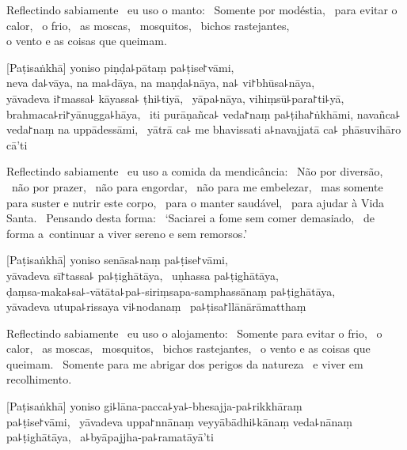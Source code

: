 \begin{english}
  Reflectindo sabiamente \pause\ eu uso o manto: \pause\ Somente por modéstia, \pause\
  para evitar o calor, \pause\ o frio, \pause\ as moscas, \pause\ mosquitos,
  \pause\ bichos rastejantes, \pause\\ o vento e as coisas que queimam.
\end{english}

[Paṭisaṅkhā] yoniso piṇḍa꜕pātaṃ pa꜕ṭise꜓vāmi, \pause\\
neva da꜕vāya, na ma꜕dāya, na maṇḍa꜕nāya, na꜕ vi꜓bhūsa꜕nāya, \pause\\
yāvadeva i꜓massa꜕ kāyassa꜕ ṭhi꜕tiyā, \pause\ yāpa꜕nāya, vihiṃsū꜕para꜓ti꜕yā, \pause\\
brahmaca꜕ri꜓yānugga꜕hāya, \pause\ iti purāṇañca꜕ veda꜓naṃ pa꜕ṭiha꜓ṅkhāmi,
navañca꜕ veda꜓naṃ na uppādessāmi, \pause\ yātrā ca꜕ me bhavissati a꜕navajjatā
ca꜕ phāsuvihāro cā'ti

\begin{english}
  Reflectindo sabiamente \pause\ eu uso a comida da mendicância: \pause\ Não por
  diversão, \pause\ não por prazer, \pause\ não para engordar, \pause\ não para
  me embelezar, \pause\ mas somente para suster e nutrir este corpo, \pause\
  para o manter saudável, \pause\ para ajudar à Vida Santa. \pause\ Pensando
  desta forma: \pause\ `Saciarei a fome sem comer demasiado, \pause\ de
  forma a~continuar a viver sereno e sem remorsos.'
\end{english}

\clearpage

[Paṭisaṅkhā] yoniso senāsa꜕naṃ pa꜕ṭise꜓vāmi, \pause\\
yāvadeva sī꜓tassa꜕ pa꜕ṭighātāya, \pause\ uṇhassa pa꜕ṭighātāya, \pause\\
ḍaṃsa-maka꜕sa꜕-vātāta꜕pa꜕-siriṃsapa-samphassānaṃ pa꜕ṭighātāya, \pause\\
yāvadeva utupa꜕rissaya vi꜕nodanaṃ \pause\ pa꜕ṭisa꜓llānārāmatthaṃ

\begin{english}
  Reflectindo sabiamente \pause\ eu uso o alojamento: \pause\ Somente para evitar o
  frio, \pause\ o calor, \pause\ as moscas, \pause\ mosquitos, \pause\ bichos
  rastejantes, \pause\ o vento e as coisas que queimam. \pause\ Somente para me
  abrigar dos perigos da natureza \pause\ e viver em recolhimento.
\end{english}

[Paṭisaṅkhā] yoniso gi꜕lāna-pacca꜕ya꜕-bhesajja-pa꜕rikkhāraṃ\\
pa꜕ṭise꜓vāmi, \pause\ yāvadeva uppa꜓nnānaṃ veyyābādhi꜕kānaṃ veda꜕nānaṃ
pa꜕ṭighātāya, \pause\ a꜕byāpajjha-pa꜕ramatāyā'ti

